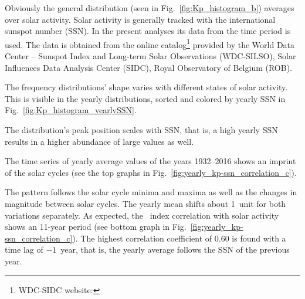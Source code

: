 Obviously the general \Kp{} distribution (seen in Fig.~\ref{fig:Kp_histogram_b}) averages over solar activity. Solar activity is generally tracked with the international sunspot number (SSN). In the present analyses its data from the time period \citeyear{sidc1917} is used. The data is obtained from the online catalog\footnote{WDC-SIDC website: } provided by the World Data Center -- Sunspot Index and Long-term Solar Observations (WDC-SILSO), Solar Influences Data Analysis Center (SIDC), Royal Observatory of Belgium (ROB).

The \Kp{} frequency distributions' shape varies with different states of solar activity. This is visible in the yearly distributions, sorted and colored by yearly SSN in Fig.~\ref{fig:Kp_histogram_yearlySSN}.

The distribution's peak position scales with SSN, that is, a high yearly SSN results in a higher abundance of large \Kp{} values as well.

The time series of yearly average \Kp{} values of the years 1932--2016 shows an imprint of the solar cycles (see the top graphs in Fig.~\ref{fig:yearly_kp-ssn_correlation_c}).
\begin{figure}
\end{figure}
The \Kp{} pattern follows the solar cycle minima and maxima as well as the changes in magnitude between solar cycles. The yearly mean \Kp{} shifts about 1~unit for both variations separately. As expected, the \Kp{}~index correlation with solar activity shows an 11-year period (see bottom graph in Fig.~\ref{fig:yearly_kp-ssn_correlation_c}). The highest correlation coefficient of 0.60 is found with a time lag of $-1$~year, that is, the yearly average \Kp{} follows the SSN of the previous year.

